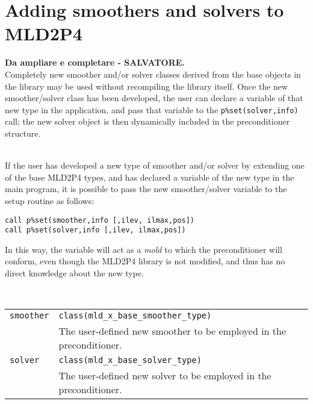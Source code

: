 \clearpage

\section{Adding smoothers and solvers to MLD2P4\label{sec:adding}}

\textbf{Da ampliare e completare - SALVATORE.} \\

Completely new smoother and/or solver classes derived from the
base objects in the library may be used without recompiling the
library itself. Once the new smoother/solver class has been
developed, the user can declare a variable of that new type in the
application, and pass that variable to the \verb|p%set(solver,info)|
call; the new solver object is then dynamically included in the
preconditioner structure. 

\ \\

If the user has developed  a new type of smoother and/or
solver by extending one of the base MLD2P4 types, and has declared a
variable of the new  type in the main program, it is possible to pass
the new smoother/solver variable  to the setup routine as follows:
\begin{center}
\verb|call p%set(smoother,info [,ilev, ilmax,pos])|\\
\verb|call p%set(solver,info [,ilev, ilmax,pos])|
\end{center}
In this way, the variable will act as a \emph{mold} to which the
preconditioner will conform, even though the MLD2P4 library is not
modified, and thus has no direct knowledge about the new type. 

\ \\

\begin{tabular}{p{1.2cm}p{12cm}}
\verb|smoother| & \verb|class(mld_x_base_smoother_type)| \\
              & The user-defined new smoother to be employed in the
                preconditioner.\\
\verb|solver| & \verb|class(mld_x_base_solver_type)| \\
              & The user-defined new solver to be employed in the
                preconditioner.
\end{tabular}

